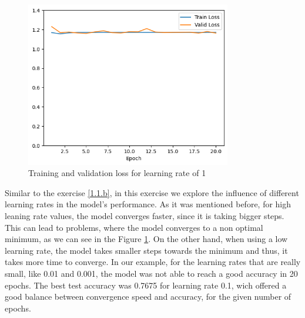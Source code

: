 \documentclass{article}
\begin{document}
\begin{figure}[H]
    \centering
    \includegraphics[width=0.8\textwidth]{"plots/mlp-training-loss-batch-16-lr-1.0-epochs-20-hidden-200-dropout-0.0-l2-0-layers-2-act-relu-opt-sgd.png"}
    \caption{Training and validation loss for learning rate of 1}
    \label{2.2b learning rate 1}
\end{figure}

Similar to the exercise \ref{1.1.b}, in this exercise we explore the influence of different learning rates in the model's performance.
As it was mentioned before, for high leaning rate values, the model converges faster, since it is taking bigger steps. This can lead to problems, 
where the model converges to a non optimal minimum, as we can see in the Figure \ref{2.2b learning rate 1}. On the other hand, when using a low learning rate,
the model takes smaller steps towards the minimum and thus, it takes more time to converge. In our example, for the learning rates that are really small, like 0.01 and 0.001,
the model was not able to reach a good accuracy in 20 epochs. The best test accuracy was 0.7675 for learning rate 0.1, wich offered a good balance between convergence speed and accuracy, for the given number of epochs.

\subsubsection{}
\end{document}
